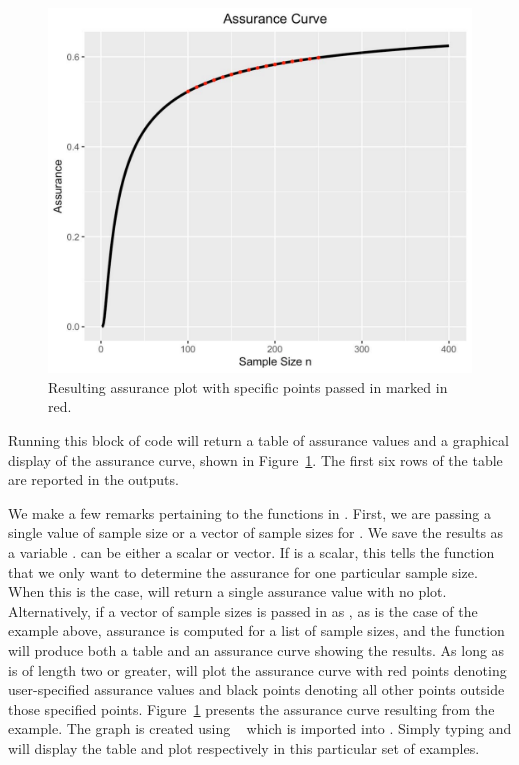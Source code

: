 \begin{figure}[t!]
\centering
\includegraphics[width = 8 cm]{assur_plot_ex1.pdf}
\caption{\label{fig:assur_plot} Resulting assurance plot
with specific points passed in marked in red.}
\end{figure}

Running this block of code will return a table of assurance values  and a graphical display of the assurance curve, shown in Figure~\ref{fig:assur_plot}. The first six rows of the table are reported in the outputs. 

We make a few remarks pertaining to the functions in .  First, we are passing a single value of sample size or a vector of sample sizes for . We save the results as a variable . %
 can be either a scalar or vector. If  is a scalar, this tells the function that we only want to determine the assurance for one particular sample size. When this is the case, 
 will return a single assurance value with no plot. Alternatively, if a vector of sample sizes is passed in as , as is the case of the example above, assurance is computed for a list of sample sizes, and the function will produce both a table and an assurance curve showing the results. As long as  is of length two or greater,  will plot the assurance curve with red points denoting user-specified assurance values and black points denoting all other points outside those specified points. 
Figure~\ref{fig:assur_plot} presents the assurance curve resulting from the example. The graph is created using ~\cite{ggplot2} which is imported into . 
Simply typing  and
 will display the table and plot respectively in this particular set of examples.

